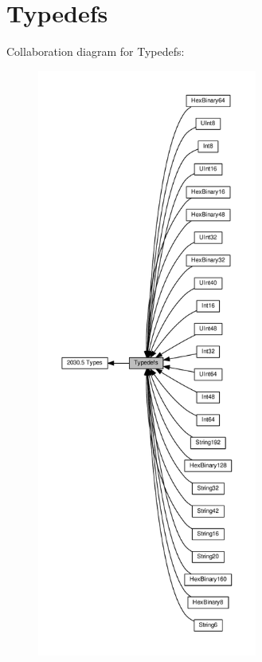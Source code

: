 \hypertarget{group__se__typedefs}{}\section{Typedefs}
\label{group__se__typedefs}
Collaboration diagram for Typedefs\+:\nopagebreak
\begin{figure}[H]
\begin{center}
\leavevmode
\includegraphics[height=550pt]{group__se__typedefs}
\end{center}
\end{figure}
